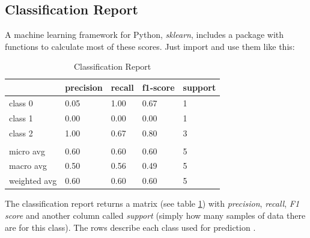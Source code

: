 \subsection{Classification Report}

A machine learning framework for Python, \textit{sklearn}, includes a package with functions to calculate most of these scores. Just import and use them like this: 



\begin{table}
  \begin{tabular}{| l | l | l | l | l |}
    \hline
                  & precision & recall  & f1-score & support \\ \hline
    class 0       & 0.05      & 1.00    & 0.67     & 1       \\
    class 1       & 0.00      & 0.00    & 0.00     & 1       \\
    class 2       & 1.00      & 0.67    & 0.80     & 3       \\
                  &           &         &          &         \\ 
    micro avg     & 0.60      & 0.60    & 0.60     & 5       \\
    macro avg     & 0.50      & 0.56    & 0.49     & 5       \\
    weighted avg  & 0.60      & 0.60    & 0.60     & 5       \\
    \hline
  \end{tabular}
  \caption{Classification Report}
  \label{table:classification_report}
\end{table}

The classification report returns a matrix (see table \ref{table:classification_report}) with \textit{precision}, \textit{recall}, \textit{F1 score} and another column called \textit{support} (simply how many samples of data there are for this class). The rows describe each class used for prediction \cite{sklearn_classification_report}.